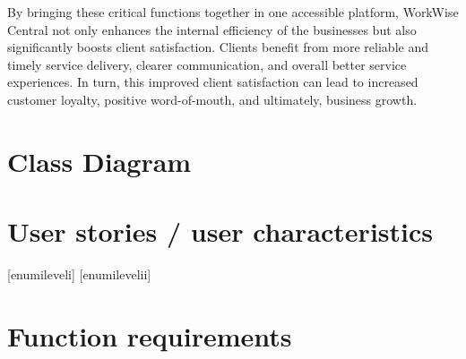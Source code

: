 \documentclass{article}
\begin{document}
	By bringing these critical functions together in one accessible platform, WorkWise Central not only enhances the internal efficiency of the businesses but also significantly boosts client satisfaction. Clients benefit from more reliable and timely service delivery, clearer communication, and overall better service experiences. In turn, this improved client satisfaction can lead to increased customer loyalty, positive word-of-mouth, and ultimately, business growth.\\
	
	\newpage
	
	\section*{Class Diagram}	
	
	\newpage
	
	\section*{User stories / user characteristics}
	
	\newpage
	
	[enumileveli]
	[enumilevelii]
	
	
	\section*{Function requirements}
\end{document}
